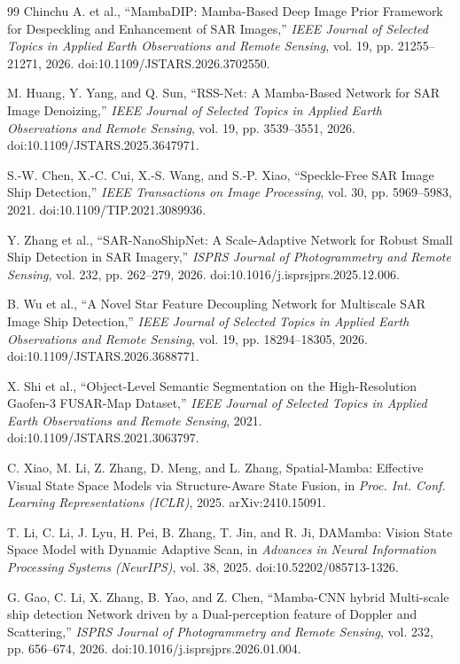 \documentclass[journal]{IEEEtran}
\begin{document}
\begin{thebibliography}{99}
Chinchu A. et al., ``MambaDIP: Mamba-Based Deep Image Prior Framework for Despeckling and Enhancement of SAR Images,'' \emph{IEEE Journal of Selected Topics in Applied Earth Observations and Remote Sensing}, vol. 19, pp. 21255--21271, 2026. doi:10.1109/JSTARS.2026.3702550.

M. Huang, Y. Yang, and Q. Sun, ``RSS-Net: A Mamba-Based Network for SAR Image Denoizing,'' \emph{IEEE Journal of Selected Topics in Applied Earth Observations and Remote Sensing}, vol. 19, pp. 3539--3551, 2026. doi:10.1109/JSTARS.2025.3647971.

S.-W. Chen, X.-C. Cui, X.-S. Wang, and S.-P. Xiao, ``Speckle-Free SAR Image Ship Detection,'' \emph{IEEE Transactions on Image Processing}, vol. 30, pp. 5969--5983, 2021. doi:10.1109/TIP.2021.3089936.

Y. Zhang et al., ``SAR-NanoShipNet: A Scale-Adaptive Network for Robust Small Ship Detection in SAR Imagery,'' \emph{ISPRS Journal of Photogrammetry and Remote Sensing}, vol. 232, pp. 262--279, 2026. doi:10.1016/j.isprsjprs.2025.12.006.

B. Wu et al., ``A Novel Star Feature Decoupling Network for Multiscale SAR Image Ship Detection,'' \emph{IEEE Journal of Selected Topics in Applied Earth Observations and Remote Sensing}, vol. 19, pp. 18294--18305, 2026. doi:10.1109/JSTARS.2026.3688771.

X. Shi et al., ``Object-Level Semantic Segmentation on the High-Resolution Gaofen-3 FUSAR-Map Dataset,'' \emph{IEEE Journal of Selected Topics in Applied Earth Observations and Remote Sensing}, 2021. doi:10.1109/JSTARS.2021.3063797.

C. Xiao, M. Li, Z. Zhang, D. Meng, and L. Zhang, Spatial-Mamba: Effective Visual State Space Models via Structure-Aware State Fusion, in \emph{Proc. Int. Conf. Learning Representations (ICLR)}, 2025. arXiv:2410.15091.

T. Li, C. Li, J. Lyu, H. Pei, B. Zhang, T. Jin, and R. Ji, DAMamba: Vision State Space Model with Dynamic Adaptive Scan, in \emph{Advances in Neural Information Processing Systems (NeurIPS)}, vol. 38, 2025. doi:10.52202/085713-1326.

G. Gao, C. Li, X. Zhang, B. Yao, and Z. Chen, ``Mamba-CNN hybrid Multi-scale ship detection Network driven by a Dual-perception feature of Doppler and Scattering,'' \emph{ISPRS Journal of Photogrammetry and Remote Sensing}, vol. 232, pp. 656--674, 2026. doi:10.1016/j.isprsjprs.2026.01.004.


\end{thebibliography}
\end{document}
